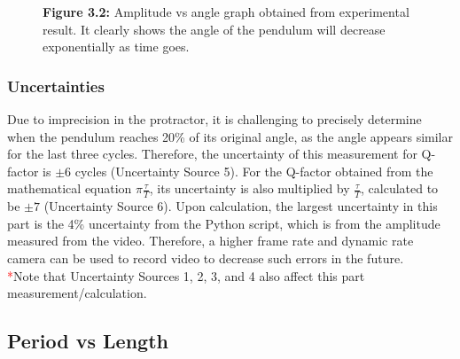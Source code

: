 \documentclass[11pt,titlepage,a4paper,twocolumn]{article}
\begin{document}
{\begin{figure}[H]
                    \caption*{\textbf{Figure 3.2:} Amplitude vs angle graph obtained from  experimental result. It clearly shows the angle of the pendulum will decrease exponentially as time goes.}
                \end{figure}
            

        \subsubsection{Uncertainties}
            \hspace{\parindent}\hspace{\parindent}Due to imprecision in the protractor, it is challenging to precisely determine when the pendulum reaches 20\% of its original angle, as the angle appears similar for the last three cycles. Therefore, the uncertainty of this measurement for Q-factor is $\pm6$ cycles (Uncertainty Source 5). For the Q-factor obtained from the mathematical equation $\pi \frac{\tau}{T}$, its uncertainty is also multiplied by $\frac{\tau}{T}$, calculated to be $\pm7$ (Uncertainty Source 6). Upon calculation, the largest uncertainty in this part is the 4\% uncertainty from the Python script, which is from the amplitude measured from the video. Therefore, a higher frame rate and dynamic rate camera can be used to record video to decrease such errors in the future.\\
            \textcolor{red}{*}Note that Uncertainty Sources 1, 2, 3, and 4 also affect this part measurement/calculation.}

        
    \subsection{Period vs Length}
\end{document}
